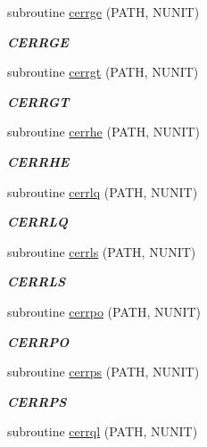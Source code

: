 \begin{DoxyCompactItemize}
subroutine \hyperlink{group__complex__lin_ga54ece51601cf2863111d777ce3e87bd1}{cerrge} (P\+A\+T\+H, N\+U\+N\+I\+T)
\begin{DoxyCompactList}\small\item\em {\bfseries C\+E\+R\+R\+G\+E} \end{DoxyCompactList}\item 
subroutine \hyperlink{group__complex__lin_gac5f296b97a6c26cee5a9b7b49c31f335}{cerrgt} (P\+A\+T\+H, N\+U\+N\+I\+T)
\begin{DoxyCompactList}\small\item\em {\bfseries C\+E\+R\+R\+G\+T} \end{DoxyCompactList}\item 
subroutine \hyperlink{group__complex__lin_ga2ae3cd7f6183c27b64398b1181dcd16f}{cerrhe} (P\+A\+T\+H, N\+U\+N\+I\+T)
\begin{DoxyCompactList}\small\item\em {\bfseries C\+E\+R\+R\+H\+E} \end{DoxyCompactList}\item 
subroutine \hyperlink{group__complex__lin_gadb1298b68648e1e729847273f7958ce1}{cerrlq} (P\+A\+T\+H, N\+U\+N\+I\+T)
\begin{DoxyCompactList}\small\item\em {\bfseries C\+E\+R\+R\+L\+Q} \end{DoxyCompactList}\item 
subroutine \hyperlink{group__complex__lin_ga8fd173ef8bf409854356fa3f27a84989}{cerrls} (P\+A\+T\+H, N\+U\+N\+I\+T)
\begin{DoxyCompactList}\small\item\em {\bfseries C\+E\+R\+R\+L\+S} \end{DoxyCompactList}\item 
subroutine \hyperlink{group__complex__lin_ga98b93dd62b8acae097a04b80acafca55}{cerrpo} (P\+A\+T\+H, N\+U\+N\+I\+T)
\begin{DoxyCompactList}\small\item\em {\bfseries C\+E\+R\+R\+P\+O} \end{DoxyCompactList}\item 
subroutine \hyperlink{group__complex__lin_ga8e378f7a528a248e3bc98ee6f9ae4899}{cerrps} (P\+A\+T\+H, N\+U\+N\+I\+T)
\begin{DoxyCompactList}\small\item\em {\bfseries C\+E\+R\+R\+P\+S} \end{DoxyCompactList}\item 
subroutine \hyperlink{group__complex__lin_gab42ae8211e03e992db0bd002f2c401bf}{cerrql} (P\+A\+T\+H, N\+U\+N\+I\+T)

\end{DoxyCompactItemize}
